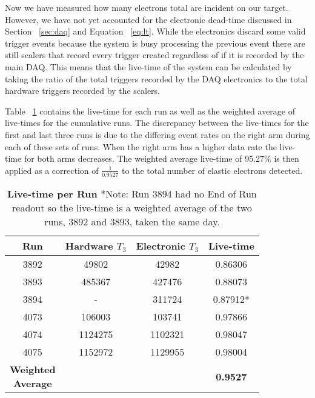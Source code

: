Now we have measured how many electrons total are incident on our target. However, we have not yet accounted for the electronic dead-time discussed in Section ~\ref{sec:daq} and Equation ~\ref{eq:lt}. While the electronics discard some valid trigger events because the system is busy processing the previous event there are still scalers that record every trigger created regardless of if it is recorded by the main DAQ. This means that the live-time of the system can be calculated by taking the ratio of the total triggers recorded by the DAQ electronics to the total hardware triggers recorded by the scalers. 

Table ~\ref{tab:live-time} contains the live-time for each run as well as the weighted average of live-times for the cumulative runs. The discrepancy between the live-times for the first and last three runs is due to the differing event rates on the right arm during each of these sets of runs. When the right arm has a higher data rate the live-time for both arms decreases. The weighted average live-time of 95.27$\%$ is then applied as a correction of $\frac{1}{0.9527}$ to the total number of elastic electrons detected.

\vspace{5mm}

\begin{table}[!h]
\centering
\begin{tabular}{|c c c c|}
\hline
\textbf{Run} & \makecell{\textbf{Hardware}\\ \textbf{$T_3$}} & \makecell{\textbf{Electronic}\\ \textbf{$T_3$}} & \textbf{Live-time}\\
\hline
3892 & 49802 & 42982 & 0.86306 \\
3893 & 485367 & 427476 & 0.88073 \\
3894 & - & 311724 & 0.87912* \\
4073 & 106003 & 103741 & 0.97866 \\
4074 & 1124275 & 1102321 & 0.98047 \\
4075 & 1152972 & 1129955 & 0.98004 \\  
\hline
\makecell{\textbf{Weighted}\\ \textbf{Average}} &  &  & \textbf{0.9527} \\
\hline
\end{tabular}
\caption{{\bf{Live-time per Run}} *Note: Run 3894 had no End of Run readout so the live-time is a weighted average of the two runs, 3892 and 3893, taken the same day.}
\label{tab:live-time}
\end{table}

